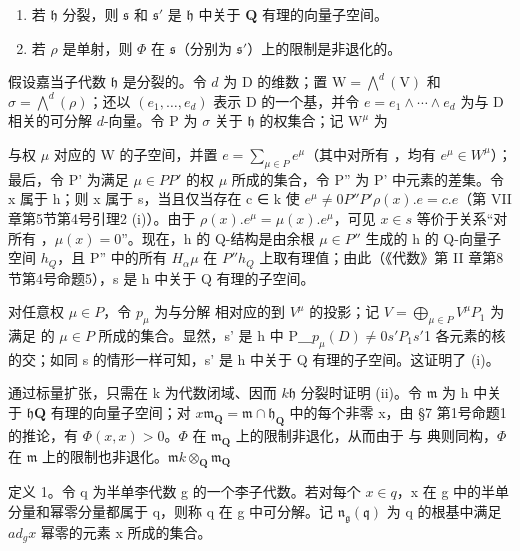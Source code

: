 \begin{enumerate}
\def\labelenumi{(\roman{enumi})}
\item
  若 \(\mathfrak{h}\) 分裂，则 \(\mathfrak{s}\) 和 \(\mathfrak{s}'\) 是 \(\mathfrak{h}\) 中关于 \(\mathbf{Q}\) 有理的向量子空间。
\item
  若 \(\rho\) 是单射，则 \(\Phi\) 在 \(\mathfrak{s}\)（分别为 \(\mathfrak{s}'\)）上的限制是非退化的。
\end{enumerate}

假设嘉当子代数 \(\mathfrak{h}\) 是分裂的。令 \(d\) 为 D 的维数；置 \(\mathrm{W} = \bigwedge^{d}(\mathrm{V})\) 和 \(\sigma = \bigwedge^{d}(\rho)\)；还以 \((e_1, \ldots, e_d)\) 表示 D 的一个基，并令 \(e = e_1 \wedge \cdots \wedge e_d\) 为与 D 相关的可分解 \(d\)-向量。令 P 为 \(\sigma\) 关于 \(\mathfrak{h}\) 的权集合；记 \(\mathrm{W}^{\mu}\) 为

与权 \(\mu\) 对应的 W 的子空间，并置 \(e = \sum_{\mu \in P} e^{\mu}\)（其中对所有 ，均有 \(e^{\mu} \in W^{\mu}\)）；最后，令 P' 为满足 \(\mu \in P\)\(P'\) 的权 \(\mu\) 所成的集合，令 P'' 为 P' 中元素的差集。令 x 属于 h；则 x 属于 s，当且仅当存在 c ∈ k 使 \(e^{\mu} \neq 0\)\(P''\)\(P'\)\(\rho(x).e = c.e\)（第 VII 章第5节第4号引理2 (i)）。由于 \(\rho(x).e^{\mu} = \mu(x).e^{\mu}\)，可见 \(x \in s\) 等价于关系“对所有 ，\(\mu(x) = 0\)”。现在，h 的 Q-结构是由余根 \(\mu \in P''\) 生成的 h 的 Q-向量子空间 \(h_{Q}\)，且 P'' 中的所有 \(H_{\alpha}\)\(\mu\) 在 \(P''\)\(h_{Q}\) 上取有理值；由此（《代数》第 II 章第8节第4号命题5），s 是 h 中关于 Q 有理的子空间。

对任意权 \(\mu\in P\)，令 \(p_{\mu}\) 为与分解  相对应的到 \(V^{\mu}\) 的投影；记 \(V=\bigoplus_{\mu\in P}V^{\mu}\)\(P_{1}\) 为满足  的 \(\mu\in P\) 所成的集合。显然，s' 是 h 中 P＿\(p_{\mu}(D)\neq0\)\(s'\)\(P_{1}\)\(s'\)1 各元素的核的交；如同 s 的情形一样可知，s' 是 h 中关于 Q 有理的子空间。这证明了 (i)。

通过标量扩张，只需在 k 为代数闭域、因而 \(k\)\(\mathfrak{h}\) 分裂时证明 (ii)。令 \(\mathfrak{m}\) 为 h 中关于 \(\mathfrak{h}\)\(\mathbf{Q}\) 有理的向量子空间；对 \(x\)\(\mathfrak{m}_{\mathbf{Q}} = \mathfrak{m} \cap \mathfrak{h}_{\mathbf{Q}}\) 中的每个非零 x，由 §7 第1号命题1的推论，有 \(\varPhi(x, x) > 0\)。\(\varPhi\) 在 \(\mathfrak{m}_{\mathbf{Q}}\) 上的限制非退化，从而由于  与  典则同构，\(\varPhi\) 在 \(\mathfrak{m}\) 上的限制也非退化。\(\mathfrak{m}\)\(k \otimes_{\mathbf{Q}} \mathfrak{m}_{\mathbf{Q}}\)

定义 1。令 q 为半单李代数 g 的一个李子代数。若对每个 \(x \in q\)，x 在 g 中的半单分量和幂零分量都属于 q，则称 q 在 g 中可分解。记 \(\mathfrak{n}_{\mathfrak{g}}(\mathfrak{q})\) 为 q 的根基中满足 \(ad_{g}x\) 幂零的元素 x 所成的集合。

